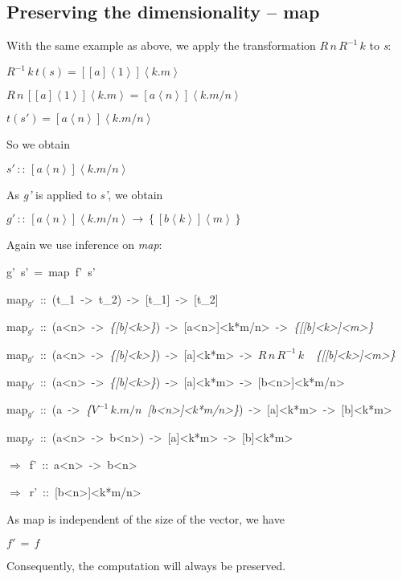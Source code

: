 \documentclass{article}
\newenvironment{lyxcode}
{\par\begin{list}{}{
\setlength{\rightmargin}{\leftmargin}
\setlength{\listparindent}{0pt}\raggedright
\setlength{\itemsep}{0pt}
\setlength{\parsep}{0pt}
\normalfont\ttfamily}\item[]}
{\end{list}}
\begin{document}
\subsection{Preserving the dimensionality -- map}

With the same example as above, we apply the transformation\emph{
}$R\, n\, R^{-1}\, k$ to \emph{s}:

$R^{-1}\, k\, t(s)=[[a]\left\langle 1\right\rangle ]\left\langle k.m\right\rangle $

\emph{$R\, n\,[[a]\left\langle 1\right\rangle ]\left\langle k.m\right\rangle =[a\left\langle n\right\rangle ]\left\langle k.m/n\right\rangle $}

$t(s')=[a\left\langle n\right\rangle ]\left\langle k.m/n\right\rangle $

So we obtain

$s'\,::\,[a\left\langle n\right\rangle ]\left\langle k.m/n\right\rangle $

As \emph{g'} is applied to \emph{s'}, we obtain 

$g'\,::\,[a\left\langle n\right\rangle ]\left\langle k.m/n\right\rangle \rightarrow\left\{ [b\left\langle k\right\rangle ]\left\langle m\right\rangle \right\} $

Again we use inference on \emph{map}:
\begin{lyxcode}
g'~s'~=~map~f'~s'

map$_{g'}$~::~(t\_1~->~t\_2)~->~{[}t\_1{]}~->~{[}t\_2{]}

map$_{g'}$~::~(a<n>~->~\emph{\{{[}b{]}<k>\}})~->~{[}a<n>{]}<k{*}m/n>~->~\emph{\{{[}{[}b{]}<k>{]}<m>\}}

map$_{g'}$~::~(a<n>~->~\emph{\{{[}b{]}<k>\}})~->~{[}a{]}<k{*}m>~->~$R\, n\, R^{-1}\, k$\emph{~~\{{[}{[}b{]}<k>{]}<m>\}}

map$_{g'}$~::~(a<n>~->~\emph{\{{[}b{]}<k>\}})~->~{[}a{]}<k{*}m>~->~{[}b<n>{]}<k{*}m/n>

map$_{g'}$~::~(a~->~\emph{\{}$V^{-1}\, k.m/n$~\emph{{[}b<n>{]}<k{*}m/n>\}})~->~{[}a{]}<k{*}m>~->~{[}b{]}<k{*}m>

map$_{g'}$~::~(a<n>~->~b<n>)~->~{[}a{]}<k{*}m>~->~{[}b{]}<k{*}m>

$\Rightarrow$~f'~::~a<n>~->~b<n>

$\Rightarrow$~r'~::~{[}b<n>{]}<k{*}m/n>
\end{lyxcode}
As map is independent of the size of the vector, we have 
\begin{lyxcode}
$f'\,=\, f$
\end{lyxcode}
Consequently, the computation will always be preserved.
\end{document}
